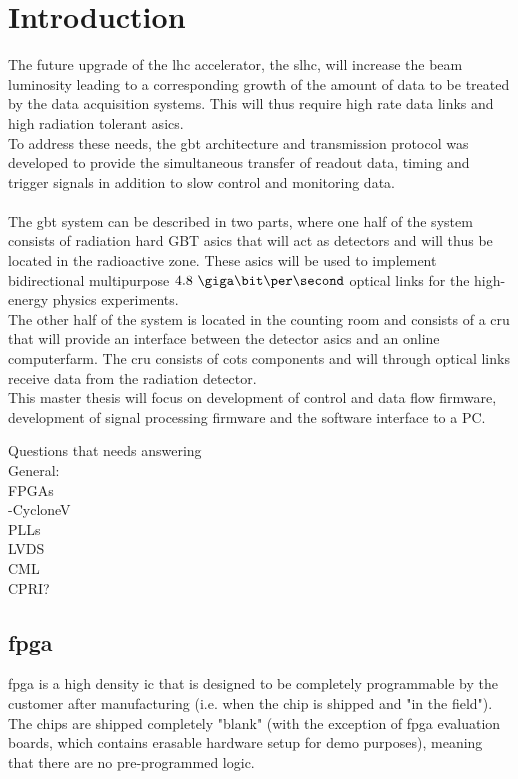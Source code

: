 \documentclass[main.tex]{subfiles}
\begin{document}
\chapter{Introduction}

The future upgrade of the \gls{lhc} accelerator, the \gls{slhc}, will increase the beam luminosity leading to a corresponding growth of the amount of data to be treated by the data acquisition systems. This will thus require high rate data links and high radiation tolerant \glspl{asic}.\\
To address these needs, the \gls{gbt} architecture and transmission protocol was developed to provide the simultaneous transfer of readout data, timing and trigger signals in addition to slow control and monitoring data. \\ \\
The \gls{gbt} system can be described in two parts, where one half of the system consists of radiation hard GBT \glspl{asic} that will act as detectors and will thus be located in the radioactive zone. These \glspl{asic} will be used to implement bidirectional multipurpose $4.8\ \giga\bit\per\second$ optical links for the high-energy physics experiments. \\
The other half of the system is located in the counting room and consists of a \gls{cru} that will provide an interface between the detector \glspl{asic} and an online computerfarm. The \gls{cru} consists of \gls{cots} components and will through optical links receive data from the radiation detector. \\
This master thesis will focus on development of control and data flow firmware, development of signal processing firmware and the software interface to a PC.


Questions that needs answering\\
General:\\
FPGAs\\
-CycloneV\\
PLLs\\
LVDS\\
CML\\
CPRI?\\

\section{\gls{fpga}}

\Gls{fpga} is a high density \gls{ic} that is designed to be completely programmable by the customer after manufacturing (i.e. when the chip is shipped and "in the field"). The chips are shipped completely "blank" (with the exception of \gls{fpga} evaluation boards, which contains erasable hardware setup for demo purposes), meaning that there are no pre-programmed logic. 
\end{document}

